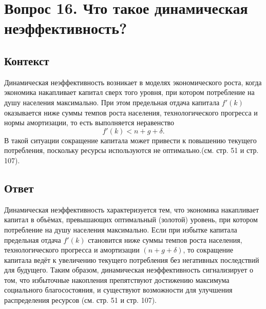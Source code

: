 \section*{Вопрос 16. Что такое динамическая неэффективность?}

\subsection*{Контекст}
Динамическая неэффективность возникает в моделях экономического роста, когда экономика накапливает капитал сверх того 
уровня, при котором потребление на душу населения максимально. При этом предельная отдача капитала \(f'(k)\) оказывается 
ниже суммы темпов роста населения, технологического прогресса и нормы амортизации, то есть выполняется неравенство
\[
f'(k) < n + g + \delta.
\]
В такой ситуации сокращение капитала может привести к повышению текущего потребления, поскольку ресурсы используются не 
оптимально.(см. стр. 51 и стр. 107).

\subsection*{Ответ}
Динамическая неэффективность характеризуется тем, что экономика накапливает капитал в объёмах, превышающих оптимальный 
(золотой) уровень, при котором потребление на душу населения максимально. Если при избытке капитала предельная отдача 
\(f'(k)\) становится ниже суммы темпов роста населения, технологического прогресса и амортизации \((n+g+\delta)\), 
то сокращение капитала ведёт к увеличению текущего потребления без негативных последствий для будущего. Таким образом, 
динамическая неэффективность сигнализирует о том, что избыточные накопления препятствуют достижению максимума социального 
благосостояния, и существуют возможности для улучшения распределения ресурсов (см. стр. 51 и стр. 107).
